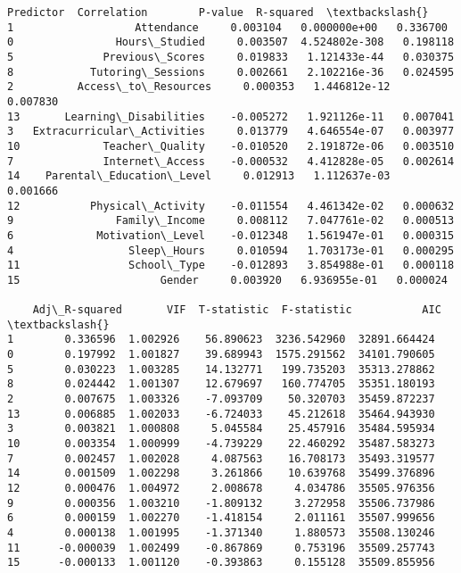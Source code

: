 \documentclass[11pt]{article}
\makeatletter
\newcommand{\boxspacing}{\kern\kvtcb@left@rule\kern\kvtcb@boxsep}
\newcommand{\prompt}[4]{
        {\ttfamily\llap{{\color{#2}[#3]:\hspace{3pt}#4}}\vspace{-\baselineskip}}
    }
\makeatother
\begin{document}
            \begin{tcolorbox}[breakable, size=fbox, boxrule=.5pt, pad at break*=1mm, opacityfill=0]
\prompt{Out}{outcolor}{283}{\boxspacing}
\begin{Verbatim}[commandchars=\\\{\}]
                     Predictor  Correlation        P-value  R-squared  \textbackslash{}
1                   Attendance     0.003104   0.000000e+00   0.336700
0                Hours\_Studied     0.003507  4.524802e-308   0.198118
5              Previous\_Scores     0.019833   1.121433e-44   0.030375
8            Tutoring\_Sessions     0.002661   2.102216e-36   0.024595
2          Access\_to\_Resources     0.000353   1.446812e-12   0.007830
13       Learning\_Disabilities    -0.005272   1.921126e-11   0.007041
3   Extracurricular\_Activities     0.013779   4.646554e-07   0.003977
10             Teacher\_Quality    -0.010520   2.191872e-06   0.003510
7              Internet\_Access    -0.000532   4.412828e-05   0.002614
14    Parental\_Education\_Level     0.012913   1.112637e-03   0.001666
12           Physical\_Activity    -0.011554   4.461342e-02   0.000632
9                Family\_Income     0.008112   7.047761e-02   0.000513
6             Motivation\_Level    -0.012348   1.561947e-01   0.000315
4                  Sleep\_Hours     0.010594   1.703173e-01   0.000295
11                 School\_Type    -0.012893   3.854988e-01   0.000118
15                      Gender     0.003920   6.936955e-01   0.000024

    Adj\_R-squared       VIF  T-statistic  F-statistic           AIC  \textbackslash{}
1        0.336596  1.002926    56.890623  3236.542960  32891.664424
0        0.197992  1.001827    39.689943  1575.291562  34101.790605
5        0.030223  1.003285    14.132771   199.735203  35313.278862
8        0.024442  1.001307    12.679697   160.774705  35351.180193
2        0.007675  1.003326    -7.093709    50.320703  35459.872237
13       0.006885  1.002033    -6.724033    45.212618  35464.943930
3        0.003821  1.000808     5.045584    25.457916  35484.595934
10       0.003354  1.000999    -4.739229    22.460292  35487.583273
7        0.002457  1.002028     4.087563    16.708173  35493.319577
14       0.001509  1.002298     3.261866    10.639768  35499.376896
12       0.000476  1.004972     2.008678     4.034786  35505.976356
9        0.000356  1.003210    -1.809132     3.272958  35506.737986
6        0.000159  1.002270    -1.418154     2.011161  35507.999656
4        0.000138  1.001995    -1.371340     1.880573  35508.130246
11      -0.000039  1.002499    -0.867869     0.753196  35509.257743
15      -0.000133  1.001120    -0.393863     0.155128  35509.855956


\end{Verbatim}
\end{tcolorbox}
\end{document}
